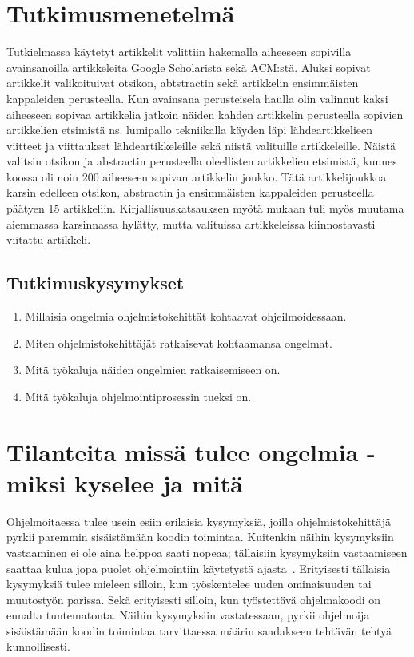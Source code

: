 \documentclass[finnish]{../tktltiki2}
\theoremstyle{definition}
\theoremstyle{remark}
\begin{document}
\section{Tutkimusmenetelmä}
Tutkielmassa käytetyt artikkelit valittiin hakemalla aiheeseen sopivilla avainsanoilla artikkeleita Google Scholarista sekä ACM:stä. Aluksi sopivat artikkelit valikoituivat otsikon, abtstractin sekä artikkelin ensimmäisten kappaleiden perusteella. Kun avainsana perusteisela haulla olin valinnut kaksi aiheeseen sopivaa artikkelia jatkoin näiden kahden artikkelin perusteella sopivien artikkelien etsimistä ns. lumipallo tekniikalla käyden läpi lähdeartikkelieen viitteet ja viittaukset lähdeartikkeleille sekä niistä valituille artikkeleille. Näistä valitsin otsikon ja abstractin perusteella oleellisten artikkelien etsimistä, kunnes koossa oli noin 200 aiheeseen sopivan artikkelin joukko. Tätä artikkelijoukkoa karsin edelleen otsikon, abstractin ja ensimmäisten kappaleiden perusteella päätyen 15 artikkeliin. Kirjallisuuskatsauksen myötä mukaan tuli myös muutama aiemmassa karsinnassa hylätty, mutta valituissa artikkeleissa kiinnostavasti viitattu artikkeli.

\subsection{Tutkimuskysymykset}
\begin{enumerate}
\item Millaisia ongelmia ohjelmistokehittät kohtaavat ohjeilmoidessaan.
\item Miten ohjelmistokehittäjät ratkaisevat kohtaamansa ongelmat.
\item Mitä työkaluja näiden ongelmien ratkaisemiseen on.
\item Mitä työkaluja ohjelmointiprosessin tueksi on.
\end{enumerate}

\section{Tilanteita missä tulee ongelmia - miksi kyselee ja mitä}
Ohjelmoitaessa tulee usein esiin erilaisia kysymyksiä, joilla ohjelmistokehittäjä pyrkii paremmin sisäistämään koodin toimintaa. Kuitenkin näihin kysymyksiin vastaaminen ei ole aina helppoa saati nopeaa; tällaisiin kysymyksiin vastaamiseen saattaa kulua jopa puolet ohjelmointiin käytetystä ajasta~\cite{eliciting-design-requirements-for-maintenance-oriented-ides}. Erityisesti tällaisia kysymyksiä tulee mieleen silloin, kun työskentelee uuden ominaisuuden tai muutostyön parissa. Sekä erityisesti silloin, kun työstettävä ohjelmakoodi on ennalta tuntematonta.
Näihin kysymyksiin vastatessaan, pyrkii ohjelmoija sisäistämään koodin toimintaa tarvittaessa määrin saadakseen tehtävän tehtyä kunnollisesti.
\end{document}
